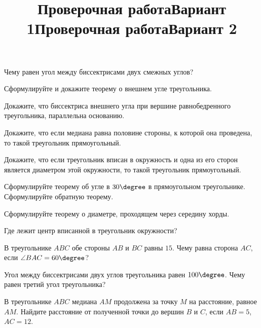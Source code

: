 \newpage
\title{Проверочная работа}
\title{Вариант 1}
\begin{listofex}
	\item
	\begin{enumcols}[itemcolumns=1]
		\item Чему равен угол между биссектрисами двух смежных углов?
		\item Сформулируйте и докажите теорему о внешнем угле треугольника.
		\item Докажите, что биссектриса внешнего угла при вершине равнобедренного треугольника, параллельна основанию.
		\item Докажите, что если медиана равна половине стороны, к которой она проведена, то такой треугольник прямоугольный.
		\item Докажите, что если треугольник вписан в окружность и одна из его сторон является диаметром этой окружности, то такой треугольник прямоугольный.
		\item Сформулируйте теорему об угле в \( 30\degree \) в прямоугольном треугольнике. Сформулируйте обратную теорему.
		\item Сформулируйте теорему о диаметре, проходящем через середину хорды.
		\item Где лежит центр вписанной в треугольник окружности?
	\end{enumcols}
	\item В треугольнике \( ABC \) обе стороны \( AB \) и \( BC \) равны \( 15 \). Чему равна сторона \( AC \), если \( \angle BAC = 60 \degree \)?
	\item Угол между биссектрисами двух углов треугольника равен \( 100\degree \). Чему равен третий угол треугольника?
	\item {}
	\item {}
	\item {}
	\item В треугольнике \( ABC \) медиана \( AM \) продолжена за точку \( M \) на расстояние, равное \( AM \). Найдите расстояние от полученной точки до вершин \( B  \) и \( C\), если \( AB = 5\), \( AC = 12\).
	\item {}
	\item {}
	\item {}
	\item {}
\end{listofex}
\newpage
\title{Проверочная работа}
\title{Вариант 2}
